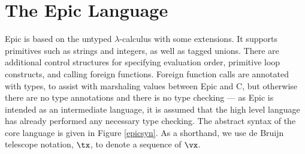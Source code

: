 \section{The Epic Language}

Epic is based on the untyped $\lambda$-calculus with some extensions.
It supports primitives such as strings and integers, as well as tagged
unions. There are additional control structures for specifying
evaluation order, primitive loop constructs, and calling foreign
functions. Foreign function calls are annotated with types, to assist
with marshaling values between Epic and C, but otherwise there are no
type annotations and there is no type checking --- as Epic is intended
as an intermediate language, it is assumed that the high level
language has already performed any necessary type checking. The
abstract syntax of the core language is given in Figure \ref{epicsyn}.
As a shorthand, we use de Bruijn telescope notation, $\tx$, to denote
a sequence of $\vx$.

\newcommand{\Con}[2]{\DC{Con}\:#1(#2)}

